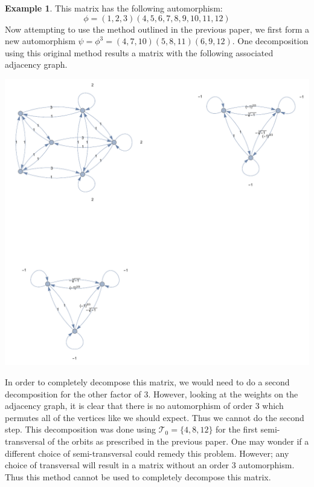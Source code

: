 \documentclass[preprint,12pt]{elsarticle}
\newcommand{\cT}{\mathcal{T}}
\theoremstyle{definition}
\newtheorem{example}[thm]{Example}
\theoremstyle{remark}
\let\oldmarginpar\marginpar
\renewcommand\marginpar[1]{\oldmarginpar[\raggedleft\footnotesize #1]%
{\raggedright\footnotesize #1}}
\newcommand{\dscomm}[1]{\textcolor{OliveGreen}{#1}}
\begin{document}
\begin{example}
This matrix has the following automorphism: $$\phi=(1,2,3)(4,5,6,7,8,9,10,11,12)$$
Now attempting to use the method outlined in the previous paper, we first form a new automorphism $\psi=\phi^3=(4,7,10)(5,8,11)(6,9,12)$. One decomposition using this original method results a matrix with the following associated adjacency graph.
\begin{center}
\includegraphics[scale=.5]{ex1_1.pdf}
\end{center}
In order to completely decompose this matrix, we would need to do a second decomposition for the other factor of 3.  However, looking at the weights on the adjacency graph, it is clear that there is no automorphism of order 3 which permutes all of the vertices like we should expect.  Thus we cannot do the second step.  This decomposition was done using $\cT_0=\{4,8,12\}$ for the first semi-transversal of the orbits as prescribed in the previous paper. One may wonder if a different choice of semi-transversal could remedy this problem. However; any choice of transversal will result in a matrix without an order 3 automorphism. Thus this method cannot be used to completely decompose this matrix.
\end{example}

\marginpar{\dscomm{we need to make a comment about the $N=1$ case.  It is a basic automorphism}}
\end{document}

